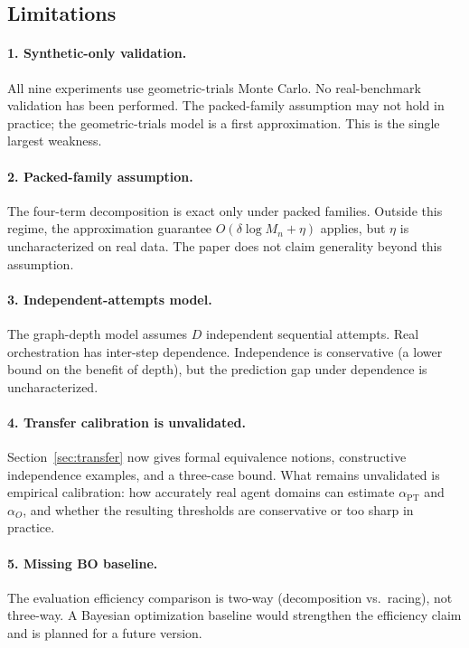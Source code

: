 \documentclass[twoside,11pt]{article}
\newcommand{\Mn}{M_n}
\begin{document}
\subsection{Limitations}

\paragraph{1. Synthetic-only validation.}
All nine experiments use geometric-trials Monte Carlo.
No real-benchmark validation has been performed.
The packed-family assumption may not hold in practice; the geometric-trials model is a first approximation.
This is the single largest weakness.

\paragraph{2. Packed-family assumption.}
The four-term decomposition is exact only under packed families.
Outside this regime, the approximation guarantee $O(\delta \log \Mn + \eta)$ applies, but $\eta$ is uncharacterized on real data.
The paper does not claim generality beyond this assumption.

\paragraph{3. Independent-attempts model.}
The graph-depth model assumes $D$ independent sequential attempts.
Real orchestration has inter-step dependence.
Independence is conservative (a lower bound on the benefit of depth), but the prediction gap under dependence is uncharacterized.

\paragraph{4. Transfer calibration is unvalidated.}
Section~\ref{sec:transfer} now gives formal equivalence notions, constructive independence examples, and a three-case bound.
What remains unvalidated is empirical calibration: how accurately real agent domains can estimate \(\alpha_{\mathrm{PT}}\) and \(\alpha_O\), and whether the resulting thresholds are conservative or too sharp in practice.

\paragraph{5. Missing BO baseline.}
The evaluation efficiency comparison is two-way (decomposition vs.\ racing), not three-way.
A Bayesian optimization baseline would strengthen the efficiency claim and is planned for a future version.
\end{document}
